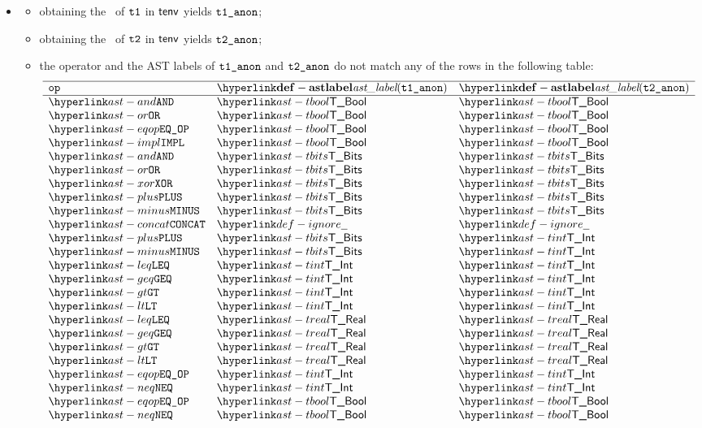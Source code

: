 \begin{itemize}
  \item {}
  \begin{itemize}
    \item obtaining the \underlyingtype\ of $\texttt{t1}$ in $\textsf{tenv}$ yields $\texttt{t1\_anon}$\ProseOrTypeError;
    \item obtaining the \underlyingtype\ of $\texttt{t2}$ in $\textsf{tenv}$ yields $\texttt{t2\_anon}$\ProseOrTypeError;
    \item the operator and the AST labels of $\texttt{t1\_anon}$ and $\texttt{t2\_anon}$ do not match any of the rows in the following table:
    \[
    \begin{array}{lll}
      \hline
      \mathbf{\op} & \mathbf{\astlabel(\vtoneanon)} & \mathbf{\astlabel(\vttwoanon)} \\
      \hline
      \AND     & \TBool  & \TBool\\
      \OR      & \TBool  & \TBool\\
      \EQOP    & \TBool  & \TBool\\
      \IMPL    & \TBool  & \TBool\\
      \AND     & \TBits  & \TBits\\
      \OR      & \TBits  & \TBits\\
      \XOR     & \TBits  & \TBits\\
      \PLUS    & \TBits  & \TBits\\
      \MINUS   & \TBits  & \TBits\\
      \CONCAT  & \Ignore & \Ignore\\
      \PLUS    & \TBits  & \TInt\\
      \MINUS   & \TBits  & \TInt\\
      \LEQ     & \TInt     & \TInt\\
      \GEQ     & \TInt     & \TInt\\
      \GT      & \TInt     & \TInt\\
      \LT      & \TInt     & \TInt\\
      \LEQ     & \TReal    & \TReal\\
      \GEQ     & \TReal    & \TReal\\
      \GT      & \TReal    & \TReal\\
      \LT      & \TReal    & \TReal\\
      \EQOP    & \TInt     & \TInt\\
      \NEQ     & \TInt     & \TInt\\
      \EQOP    & \TBool    & \TBool\\
      \NEQ     & \TBool    & \TBool\\

\end{array}\]
\end{itemize}
\end{itemize}
